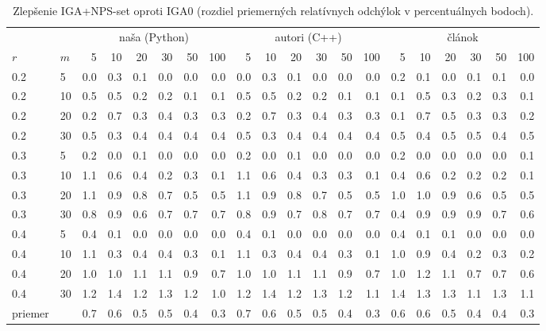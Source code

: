 \begin{table}[ht]
\centering
\scriptsize
\setlength{\tabcolsep}{3pt}
\caption{Zlepšenie IGA+NPS-set oproti IGA0 (rozdiel priemerných relatívnych odchýlok v percentuálnych bodoch).}
\label{tab:improvement_nps}
\begin{tabular}{ll|rrrrrr|rrrrrr|rrrrrr}
\toprule
 &  & \multicolumn{6}{c}{naša (Python)} & \multicolumn{6}{c}{autori (C++)} & \multicolumn{6}{c}{článok} \\
$r$ & $m$ & 5 & 10 & 20 & 30 & 50 & 100 & 5 & 10 & 20 & 30 & 50 & 100 & 5 & 10 & 20 & 30 & 50 & 100 \\
\midrule
0.2 & 5 & 0.0 & 0.3 & 0.1 & 0.0 & 0.0 & 0.0 & 0.0 & 0.3 & 0.1 & 0.0 & 0.0 & 0.0 & 0.2 & 0.1 & 0.0 & 0.1 & 0.1 & 0.0 \\
0.2 & 10 & 0.5 & 0.5 & 0.2 & 0.2 & 0.1 & 0.1 & 0.5 & 0.5 & 0.2 & 0.2 & 0.1 & 0.1 & 0.1 & 0.5 & 0.3 & 0.2 & 0.3 & 0.1 \\
0.2 & 20 & 0.2 & 0.7 & 0.3 & 0.4 & 0.3 & 0.3 & 0.2 & 0.7 & 0.3 & 0.4 & 0.3 & 0.3 & 0.1 & 0.7 & 0.5 & 0.3 & 0.3 & 0.2 \\
0.2 & 30 & 0.5 & 0.3 & 0.4 & 0.4 & 0.4 & 0.4 & 0.5 & 0.3 & 0.4 & 0.4 & 0.4 & 0.4 & 0.5 & 0.4 & 0.5 & 0.5 & 0.4 & 0.5 \\
0.3 & 5 & 0.2 & 0.0 & 0.1 & 0.0 & 0.0 & 0.0 & 0.2 & 0.0 & 0.1 & 0.0 & 0.0 & 0.0 & 0.2 & 0.0 & 0.0 & 0.0 & 0.0 & 0.1 \\
0.3 & 10 & 1.1 & 0.6 & 0.4 & 0.2 & 0.3 & 0.1 & 1.1 & 0.6 & 0.4 & 0.3 & 0.3 & 0.1 & 0.4 & 0.6 & 0.2 & 0.2 & 0.2 & 0.1 \\
0.3 & 20 & 1.1 & 0.9 & 0.8 & 0.7 & 0.5 & 0.5 & 1.1 & 0.9 & 0.8 & 0.7 & 0.5 & 0.5 & 1.0 & 1.0 & 0.9 & 0.6 & 0.5 & 0.5 \\
0.3 & 30 & 0.8 & 0.9 & 0.6 & 0.7 & 0.7 & 0.7 & 0.8 & 0.9 & 0.7 & 0.8 & 0.7 & 0.7 & 0.4 & 0.9 & 0.9 & 0.9 & 0.7 & 0.6 \\
0.4 & 5 & 0.4 & 0.1 & 0.0 & 0.0 & 0.0 & 0.0 & 0.4 & 0.1 & 0.0 & 0.0 & 0.0 & 0.0 & 0.4 & 0.1 & 0.1 & 0.0 & 0.0 & 0.0 \\
0.4 & 10 & 1.1 & 0.3 & 0.4 & 0.4 & 0.3 & 0.1 & 1.1 & 0.3 & 0.4 & 0.4 & 0.3 & 0.1 & 1.0 & 0.9 & 0.4 & 0.2 & 0.3 & 0.2 \\
0.4 & 20 & 1.0 & 1.0 & 1.1 & 1.1 & 0.9 & 0.7 & 1.0 & 1.0 & 1.1 & 1.1 & 0.9 & 0.7 & 1.0 & 1.2 & 1.1 & 0.7 & 0.7 & 0.6 \\
0.4 & 30 & 1.2 & 1.4 & 1.2 & 1.3 & 1.2 & 1.0 & 1.2 & 1.4 & 1.2 & 1.3 & 1.2 & 1.1 & 1.4 & 1.3 & 1.3 & 1.1 & 1.3 & 1.1 \\
\midrule
priemer &  & 0.7 & 0.6 & 0.5 & 0.5 & 0.4 & 0.3 & 0.7 & 0.6 & 0.5 & 0.5 & 0.4 & 0.3 & 0.6 & 0.6 & 0.5 & 0.4 & 0.4 & 0.3 \\
\bottomrule
\end{tabular}
\end{table}
